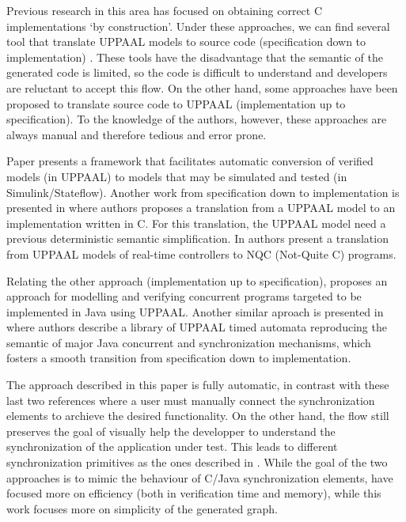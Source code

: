 \documentclass[conference]{IEEEtran}
\begin{document}
Previous research in this area has focused on obtaining correct C implementations `by construction'. Under these approaches, we can find several tool that translate UPPAAL models to source code (specification  down to implementation) \cite{pedersen}\cite{hendriks01}\cite{amnell04}. These tools have the disadvantage that the semantic of the generated code is limited, so the code is difficult to understand and developers are reluctant to accept this flow. On the other hand, some approaches \cite{cicirelli2011} have been proposed to translate source code to UPPAAL (implementation up to specification). To the knowledge of the authors, however, these approaches are always manual and therefore tedious and error prone.

Paper \cite{pajik11} presents a framework  that facilitates automatic conversion of verified models (in UPPAAL) to models that may be simulated and tested (in Simulink/Stateflow). Another work from specification  down to implementation is presented in \cite{pedersen} where authors proposes a translation from a UPPAAL model to an implementation written in C. For this translation, the UPPAAL model need a previous deterministic semantic simplification.
In \cite{hendriks01} authors present a translation from UPPAAL models of real-time controllers to NQC (Not-Quite C) programs.

Relating the other approach (implementation up to specification), \cite{cicirelli2011} proposes an approach for modelling and verifying concurrent programs targeted to be implemented in Java using UPPAAL. Another similar aproach is presented in \cite{cicirelli13} where authors describe a library of UPPAAL timed automata reproducing the semantic of major Java concurrent and synchronization mechanisms, which fosters a smooth transition from specification down to implementation.

The approach described in this paper is fully automatic, in contrast with these last two references where a user must manually connect the synchronization elements to archieve the desired functionality. On the other hand, the flow still preserves the goal of visually help the developper to understand the synchronization of the application under test. This leads to different synchronization primitives as the ones described in \cite{cicirelli2011}\cite{cicirelli13}. While the goal of the two approaches is to mimic the behaviour of C/Java synchronization elements, \cite{cicirelli2011}\cite{cicirelli13} have focused more on efficiency (both in verification time and memory), while this work focuses more on simplicity of the generated graph.
\end{document}
